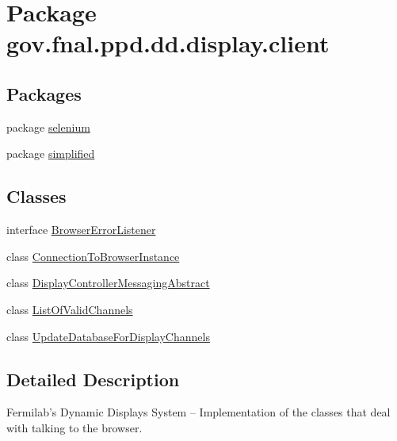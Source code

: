 \hypertarget{namespacegov_1_1fnal_1_1ppd_1_1dd_1_1display_1_1client}{\section{Package gov.\-fnal.\-ppd.\-dd.\-display.\-client}
\label{namespacegov_1_1fnal_1_1ppd_1_1dd_1_1display_1_1client}
}
\subsection*{Packages}
\begin{DoxyCompactItemize}
\item 
package \hyperlink{namespacegov_1_1fnal_1_1ppd_1_1dd_1_1display_1_1client_1_1selenium}{selenium}
\item 
package \hyperlink{namespacegov_1_1fnal_1_1ppd_1_1dd_1_1display_1_1client_1_1simplified}{simplified}
\end{DoxyCompactItemize}
\subsection*{Classes}
\begin{DoxyCompactItemize}
\item 
interface \hyperlink{interfacegov_1_1fnal_1_1ppd_1_1dd_1_1display_1_1client_1_1BrowserErrorListener}{Browser\-Error\-Listener}
\item 
class \hyperlink{classgov_1_1fnal_1_1ppd_1_1dd_1_1display_1_1client_1_1ConnectionToBrowserInstance}{Connection\-To\-Browser\-Instance}
\item 
class \hyperlink{classgov_1_1fnal_1_1ppd_1_1dd_1_1display_1_1client_1_1DisplayControllerMessagingAbstract}{Display\-Controller\-Messaging\-Abstract}
\item 
class \hyperlink{classgov_1_1fnal_1_1ppd_1_1dd_1_1display_1_1client_1_1ListOfValidChannels}{List\-Of\-Valid\-Channels}
\item 
class \hyperlink{classgov_1_1fnal_1_1ppd_1_1dd_1_1display_1_1client_1_1UpdateDatabaseForDisplayChannels}{Update\-Database\-For\-Display\-Channels}
\end{DoxyCompactItemize}


\subsection{Detailed Description}
Fermilab's Dynamic Displays System -- Implementation of the classes that deal with talking to the browser.